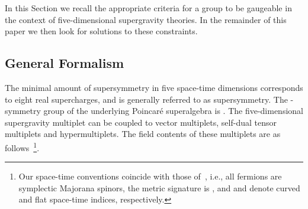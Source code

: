 \documentclass[a4paper,11pt]{article}
\begin{document}
In this Section we recall the appropriate criteria for a group \coordHE{} to be gaugeable in the context of five-dimensional \coordHE{}
supergravity theories. In the remainder of this paper we then look
for solutions to these constraints. 


\subsection{General Formalism}

The minimal amount of supersymmetry in five space-time dimensions
corresponds to eight real supercharges, and is generally referred to as
\coordHE{} supersymmetry. The \coordHE{}-symmetry group of the underlying
Poincar\'{e} superalgebra is \coordHE{}.  The
five-dimensional \coordHE{} supergravity multiplet can be coupled to
vector multiplets, self-dual tensor multiplets and hypermultiplets. The
field contents of these multiplets are as follows~\footnote{Our space-time
conventions coincide with those of~\cite{GST1,GST2,GZ1,CD}, i.e., all
fermions are symplectic Majorana spinors, the metric signature is
\myHighlight{$(-,+,+,+,+)$}\coordHE{}, and \myHighlight{$\mu,\nu\ldots$}\coordHE{} and \coordHE{} denote curved and flat
space-time indices, respectively.}.
\end{document}
